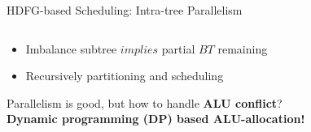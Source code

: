 \documentclass{beamer}
\begin{document}
\begin{CJK}{UTF8}{bkai}
\begin{frame}{HDFG-based Scheduling: Intra-tree Parallelism}
\begin{columns}
\begin{column}{0.6\textwidth}
\begin{itemize}
                        \pause
                        \item {Imbalance subtree $implies$ partial $BT$ remaining}
                        \pause
                        \item {Recursively partitioning and scheduling}
                        \end{itemize} 
                        \pause
                        \vspace{1em} 
                        Parallelism is good, but how to handle \textbf{ALU conflict}?\\
                        \pause
                        \vspace{1em} 
                        \centering
                        {\large{\textbf{Dynamic programming (DP) based ALU-allocation!}}}
                    \end{column}
                \end{columns}
            \end{frame}


\end{CJK}
\end{document}
